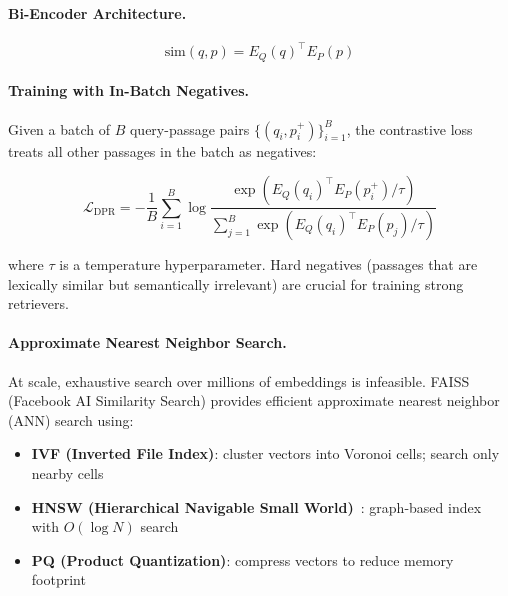 \paragraph{Bi-Encoder Architecture.}
\label{bi-encoder-architecture.}

\begin{equation}
  \text{sim}(q, p) = E_Q(q)^\top E_P(p)
\end{equation}

\paragraph{Training with In-Batch Negatives.}
\label{training-with-in-batch-negatives.}

Given a batch of $B$ query-passage pairs $\{(q_i, p_i^+)\}_{i=1}^B$, the contrastive loss treats all other passages in the batch as negatives:

\begin{equation}
  \mathcal{L}_{\text{DPR}} = -\frac{1}{B} \sum_{i=1}^{B}
    \log \frac{\exp\!\left(E_Q(q_i)^\top E_P(p_i^+) / \tau\right)}
              {\sum_{j=1}^{B} \exp\!\left(E_Q(q_i)^\top E_P(p_j) / \tau\right)}
\end{equation}

where $\tau$ is a temperature hyperparameter. Hard negatives (passages that are lexically similar but semantically irrelevant) are crucial for training strong retrievers.

\paragraph{Approximate Nearest Neighbor Search.}
\label{approximate-nearest-neighbor-search.}

At scale, exhaustive search over millions of embeddings is infeasible. FAISS~\cite{johnson2019billion} (Facebook AI Similarity Search) provides efficient approximate nearest neighbor (ANN) search using:

\begin{itemize}
  \item \textbf{IVF (Inverted File Index)}: cluster vectors into Voronoi cells; search only nearby cells
  \item \textbf{HNSW (Hierarchical Navigable Small World)}~\cite{malkov2018efficient}: graph-based index with $O(\log N)$ search
  \item \textbf{PQ (Product Quantization)}: compress vectors to reduce memory footprint
\end{itemize}

